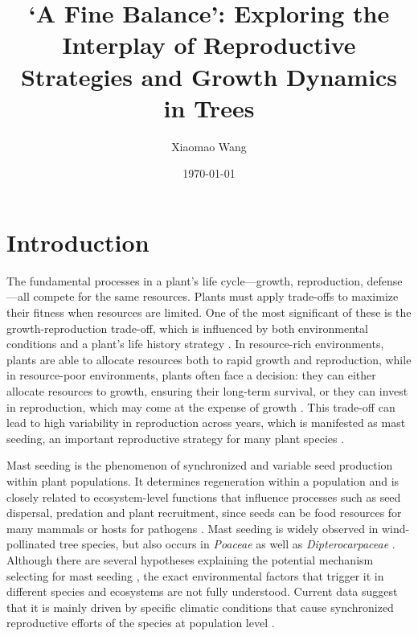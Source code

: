 \documentclass[11pt,letter]{article}
\begin{document}
\title{`A Fine Balance': Exploring the Interplay of Reproductive Strategies and Growth Dynamics in Trees}
\author{Xiaomao Wang} 
\date{\today}
\maketitle


\section{Introduction} 
The fundamental processes in a plant's life cycle—growth, reproduction, defense—all compete for the same resources. Plants must apply trade-offs to maximize their fitness when resources are limited. One of the most significant of these is the growth-reproduction trade-off, which is influenced by both environmental conditions and a plant's life history strategy \citep{grime1977evidence, stearns1998evolution}. In resource-rich environments, plants are able to allocate resources both to rapid growth and reproduction, while in resource-poor environments, plants often face a decision: they can either allocate resources to growth, ensuring their long-term survival, or they can invest in reproduction, which may come at the expense of growth \citep{bazzaz1997allocation}. This trade-off can lead to high variability in reproduction across years, which is manifested as mast seeding, an important reproductive strategy for many plant species \citep{pearse2016mechanisms}.

Mast seeding is the phenomenon of synchronized and variable seed production within plant populations. It determines regeneration within a population and is closely related to ecosystem-level functions that influence processes such as seed dispersal, predation and plant recruitment, since seeds can be food resources for many mammals or hosts for pathogens  \citep{davies2024seed, janzen1971seed, kelly1994evolutionary}. Mast seeding is widely observed in wind-pollinated tree species, but also occurs in \textit{Poaceae} as well as \textit{Dipterocarpaceae} \citep{kelly2002mast}. Although there are several hypotheses explaining the potential mechanism selecting for mast seeding  \citep[e.g., predator satiation, resource matching, etc., discussed more in Chapter 2,][]{koenig2021brief}, the exact environmental factors that trigger it in different species and ecosystems are not fully understood. Current data suggest that it is mainly driven by specific climatic conditions that cause synchronized reproductive efforts of the species at population level  \citep{pearse2016mechanisms}.
\end{document}
